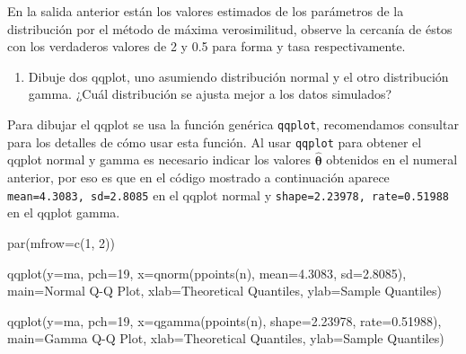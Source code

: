 \documentclass[
]{book}
\makeatletter
\newenvironment{Shaded}{\begin{snugshade}}{\end{snugshade}}
\newcommand{\AttributeTok}[1]{\textcolor[rgb]{0.77,0.63,0.00}{#1}}
\newcommand{\DecValTok}[1]{\textcolor[rgb]{0.00,0.00,0.81}{#1}}
\newcommand{\FloatTok}[1]{\textcolor[rgb]{0.00,0.00,0.81}{#1}}
\newcommand{\FunctionTok}[1]{\textcolor[rgb]{0.00,0.00,0.00}{#1}}
\newcommand{\NormalTok}[1]{#1}
\newcommand{\StringTok}[1]{\textcolor[rgb]{0.31,0.60,0.02}{#1}}
\providecommand{\tightlist}{%
  \setlength{\itemsep}{0pt}\setlength{\parskip}{0pt}}
\newenvironment{kframe}{%
\medskip{}
\setlength{\fboxsep}{.8em}
 \def\at@end@of@kframe{}%
 \ifinner\ifhmode%
  \def\at@end@of@kframe{\end{minipage}}%
  \begin{minipage}{\columnwidth}%
 \fi\fi%
 \def\FrameCommand##1{\hskip\@totalleftmargin \hskip-\fboxsep
 \colorbox{shadecolor}{##1}\hskip-\fboxsep
     \hskip-\linewidth \hskip-\@totalleftmargin \hskip\columnwidth}%
 \MakeFramed {\advance\hsize-\width
   \@totalleftmargin\z@ \linewidth\hsize
   \@setminipage}}%
 {\par\unskip\endMakeFramed%
 \at@end@of@kframe}
\renewenvironment{Shaded}{\begin{kframe}}{\end{kframe}}
\makeatother
\begin{document}
En la salida anterior están los valores estimados de los parámetros de la distribución por el método de máxima verosimilitud, observe la cercanía de éstos con los verdaderos valores de 2 y 0.5 para forma y tasa respectivamente.

\begin{enumerate}
\def\labelenumi{\arabic{enumi})}
\setcounter{enumi}{3}
\tightlist
\item
  Dibuje dos qqplot, uno asumiendo distribución normal y el otro distribución gamma. ¿Cuál distribución se ajusta mejor a los datos simulados?
\end{enumerate}

Para dibujar el qqplot se usa la función genérica \texttt{qqplot}, recomendamos consultar \citet{hernandez_correa} para los detalles de cómo usar esta función. Al usar \texttt{qqplot} para obtener el qqplot normal y gamma es necesario indicar los valores \(\hat{\boldsymbol{\theta}}\) obtenidos en el numeral anterior, por eso es que en el código mostrado a continuación aparece \texttt{mean=4.3083,\ sd=2.8085} en el qqplot normal y \texttt{shape=2.23978,\ rate=0.51988} en el qqplot gamma.

\begin{Shaded}
\begin{Highlighting}[]
\FunctionTok{par}\NormalTok{(}\AttributeTok{mfrow=}\FunctionTok{c}\NormalTok{(}\DecValTok{1}\NormalTok{, }\DecValTok{2}\NormalTok{))}

\FunctionTok{qqplot}\NormalTok{(}\AttributeTok{y=}\NormalTok{ma, }\AttributeTok{pch=}\DecValTok{19}\NormalTok{,}
       \AttributeTok{x=}\FunctionTok{qnorm}\NormalTok{(}\FunctionTok{ppoints}\NormalTok{(n), }\AttributeTok{mean=}\FloatTok{4.3083}\NormalTok{, }\AttributeTok{sd=}\FloatTok{2.8085}\NormalTok{),}
       \AttributeTok{main=}\StringTok{\textquotesingle{}Normal Q{-}Q Plot\textquotesingle{}}\NormalTok{,}
       \AttributeTok{xlab=}\StringTok{\textquotesingle{}Theoretical Quantiles\textquotesingle{}}\NormalTok{,}
       \AttributeTok{ylab=}\StringTok{\textquotesingle{}Sample Quantiles\textquotesingle{}}\NormalTok{)}

\FunctionTok{qqplot}\NormalTok{(}\AttributeTok{y=}\NormalTok{ma, }\AttributeTok{pch=}\DecValTok{19}\NormalTok{,}
       \AttributeTok{x=}\FunctionTok{qgamma}\NormalTok{(}\FunctionTok{ppoints}\NormalTok{(n), }\AttributeTok{shape=}\FloatTok{2.23978}\NormalTok{, }\AttributeTok{rate=}\FloatTok{0.51988}\NormalTok{),}
       \AttributeTok{main=}\StringTok{\textquotesingle{}Gamma Q{-}Q Plot\textquotesingle{}}\NormalTok{,}
       \AttributeTok{xlab=}\StringTok{\textquotesingle{}Theoretical Quantiles\textquotesingle{}}\NormalTok{,}
       \AttributeTok{ylab=}\StringTok{\textquotesingle{}Sample Quantiles\textquotesingle{}}\NormalTok{)}
\end{Highlighting}
\end{Shaded}
\end{document}
